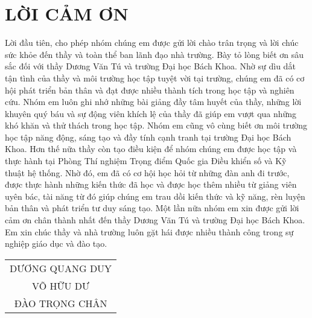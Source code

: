 \section*{LỜI CẢM ƠN}
\thispagestyle{empty} %
Lời đầu tiên, cho phép nhóm chúng em được gửi lời chào trân trọng và lời chúc sức khỏe đến thầy
và toàn thể ban lãnh đạo nhà trường. Bày tỏ lòng biết ơn sâu sắc đối với thầy Dương Văn Tú 
và trường Đại học Bách Khoa. Nhờ sự dìu dắt tận tình của thầy và
môi trường học tập tuyệt vời tại trường, chúng em đã có cơ hội phát triển bản thân và đạt được
nhiều thành tích trong học tập và nghiên cứu.
Nhóm em luôn ghi nhớ những bài giảng đầy tâm huyết của thầy, những lời khuyên quý báu
và sự động viên khích lệ của thầy đã giúp em vượt qua những khó khăn và thử thách
trong học tập. Nhóm em cũng vô cùng biết ơn môi trường học tập năng động, sáng tạo và đầy
tính cạnh tranh tại trường Đại học Bách Khoa. Hơn thế nữa thầy còn tạo điều kiện để 
nhóm chúng em được học tập và thực hành tại Phòng Thí nghiệm Trọng điểm Quốc gia Điều khiển số và Kỹ thuật hệ thống. 
Nhờ đó, em đã có cơ hội học hỏi từ những đàn anh đi trước, được thực hành những kiến thức đã học và được học thêm nhiều từ
giảng viên uyên bác, tài năng từ đó giúp chúng em trau dồi kiến thức và kỹ năng, rèn luyện bản thân và phát
triển tư duy sáng tạo.
Một lần nữa nhóm em xin được gửi lời cảm ơn chân thành nhất đến thầy Dương Văn Tú và trường
Đại học Bách Khoa. Em xin chúc thầy và nhà trường luôn gặt hái được nhiều thành công
trong sự nghiệp giáo dục và đào tạo.
\begin{table}[H]
    \begin{flushright}
        \begin{tabular}{c}
            DƯƠNG QUANG DUY \\
            VÕ HỮU DƯ \\
            ĐÀO TRỌNG CHÂN \\   
        \end{tabular}
    \end{flushright}
\end{table}
\cleardoublepage